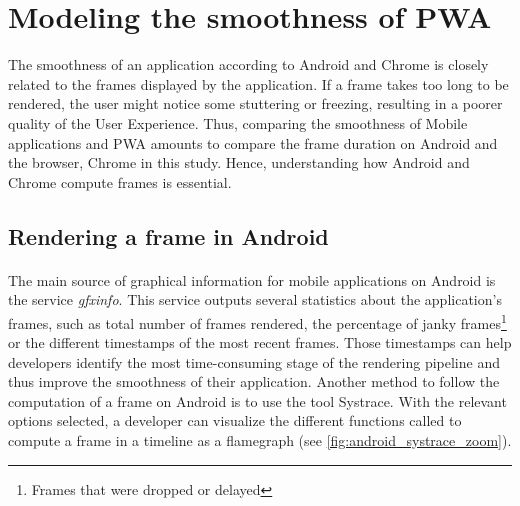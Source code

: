 \documentclass{kththesis}
\begin{document}

\section{Modeling the smoothness of PWA}
\label{method:smoothness}
    
    The smoothness of an application according to Android and Chrome is closely related to the frames displayed by the application. If a frame takes too long to be rendered, the user might notice some stuttering or freezing, resulting in a poorer quality of the User Experience. Thus, comparing the smoothness of Mobile applications and PWA amounts to compare the frame duration on Android and the browser, Chrome in this study. Hence, understanding how Android and Chrome compute frames is essential. 
    
    \subsection{Rendering a frame in Android}
    
    \paragraph{}
    The main source of graphical information for mobile applications on Android is the service \textit{gfxinfo}. This service outputs several statistics about the application's frames, such as total number of frames rendered, the percentage of janky frames\footnote{Frames that were dropped or delayed} or the different timestamps of the most recent frames. Those timestamps can help developers identify the most time-consuming stage of the rendering pipeline and thus improve the smoothness of their application. \newline
    \indent Another method to follow the computation of a frame on Android is to use the tool Systrace. With the relevant options selected, a developer can visualize the different functions called to compute a frame in a timeline as a flamegraph (see \autoref{fig:android_systrace_zoom}).
    
\end{document}
